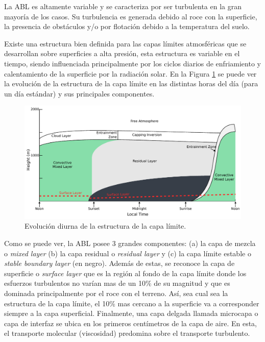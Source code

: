 La ABL es altamente variable y se caracteriza por ser turbulenta en la gran mayoría de los casos. Su turbulencia es generada debido al roce con la superficie, la presencia de obstáculos y/o por flotación debido a la temperatura del suelo. 

Existe una estructura bien definida para las capas límites atmosféricas que se desarrollan sobre superficies a alta presión, esta estructura es variable en el tiempo, siendo influenciada principalmente por los ciclos diarios de enfriamiento y calentamiento de la superficie por la radiación solar. En la Figura \ref{fig:03_abl} se puede ver la evolución de la estructura de la capa límite en las distintas horas del día (para un día estándar) y sus principales componentes.

\begin{figure}[h!]
	\centering
	\includegraphics[width=0.98\linewidth,trim={0cm 0cm 0cm 0cm},clip]{Imagenes/03/abl}
	\caption{Evolución diurna de la estructura de la capa límite.}
	\label{fig:03_abl}
\end{figure}

Como se puede ver, la ABL posee 3 grandes componentes: (a) la capa de mezcla o \emph{mixed layer} (b) la capa residual o \emph{residual layer} y (c) la capa límite estable o \emph{stable boundary layer} (en negro). Además de estas, se reconoce la capa de superficie o \emph{surface layer} que es la región al fondo de la capa límite donde los esfuerzos turbulentos no varían mas de un 10\% de su magnitud y que es dominada principalmente por el roce con el terreno. Así, sea cual sea la estructura de la capa límite, el 10\% mas cercano a la superficie va a corresponder siempre a la capa superficial. Finalmente, una capa delgada llamada microcapa o capa de interfaz se ubica en los primeros centímetros de la capa de aire. En esta, el transporte molecular (viscosidad) predomina sobre el transporte turbulento.

